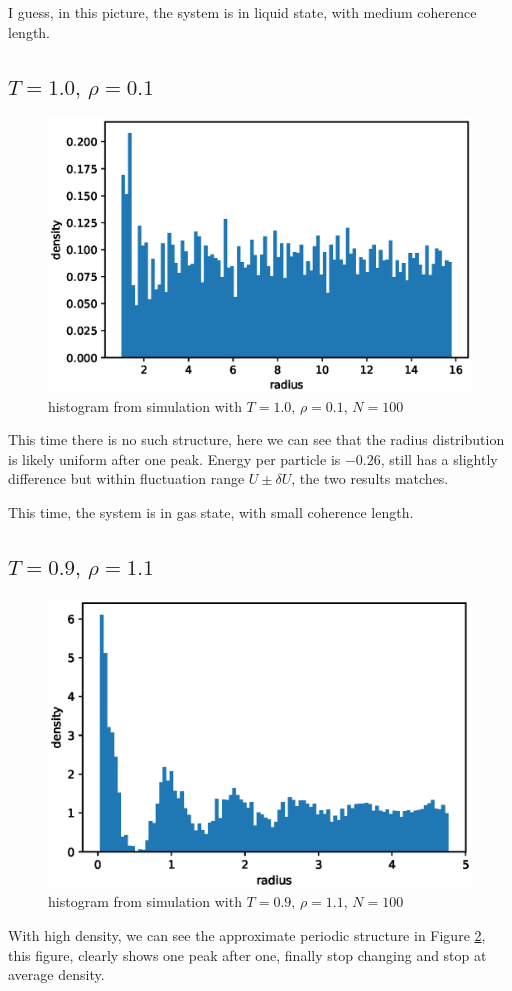 \documentclass[UTF8,a4paper]{article}
\begin{document}
I guess, in this picture, the system is in liquid state, with medium coherence length.

\subsection{$T =1.0,\, \rho = 0.1$}
\begin{figure}[h]
	\centering
	\includegraphics[height=0.2\textheight]{fig/exp2_rdf_peri_1.eps}
	\caption{histogram from simulation with $T =1.0,\, \rho = 0.1, \,  N = 100$}
	\label{fig:rdf-2}
\end{figure}
This time there is no such structure, here we can see that the radius distribution is likely uniform after one peak. Energy per particle is $-0.26$, still has a slightly difference but within 
fluctuation range $U\pm\delta U$, the two results matches.

This time, the system is in gas state, with small coherence length.
\subsection{$T =0.9,\, \rho = 1.1$}
\begin{figure}[h]
	\centering
	\includegraphics[height=0.2\textheight]{fig/rdf_exp3.eps}
	\caption{histogram from simulation with $T =0.9,\, \rho = 1.1, \,  N = 100$}
	\label{fig:rdf-3}
\end{figure}
With high density, we can see the approximate periodic structure in Figure \ref{fig:rdf-3}, this figure, clearly shows one peak after one, finally stop changing and stop at average density.
\end{document}
